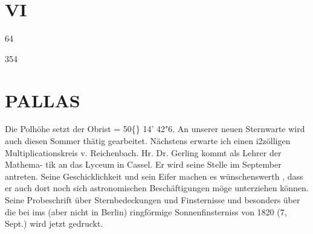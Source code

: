 \documentclass[12pt,a4paper]{article}
\newcommand{\degree}{\textdegree}
\begin{document}
\section*{VI}
64 


\newpage
354 

\section*{PALLAS}
Die  Polhöhe  setzt  der  Obrist   =  50\degree\{\}  14'  42"6. 
An  unserer  neuen  Sternwarte  wird  auch  diesen  Sommer  thätig  gearbeitet.  Nächstens  erwarte  ich 
einen  i2zölligen  Multiplicationskreis  v.  Reichenbach.  Hr.  Dr.  Gerling  kommt  als  Lehrer  der  Mathema- 
tik an  das  Lyceum  in  Cassel.  Er  wird  seine  Stelle  im  September  antreten.  Seine  Geschicklichkeit  und 
sein  Eifer  machen  es  wünschenswerth ,  dass  er  auch  dort  noch  sich  astronomischen  Beschäftigungen  möge 
unterziehen  können.  Seine  Probeschrift  über  Sternbedeckungen  und  Finsternisse  und  besonders  über  die 
bei  ims  (aber  nicht  in  Berlin)  ringförmige  Sonnenfinsterniss  von  1820  (7,  Sept.)  wird  jetzt  gedruckt. 
\end{document}
